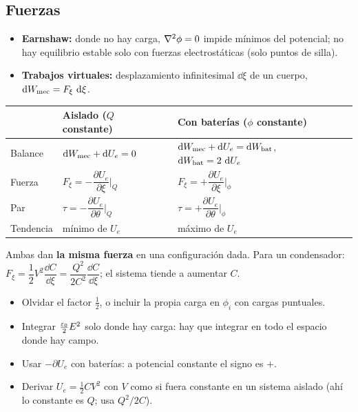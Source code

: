 \subsection{Fuerzas}

\begin{itemize}
  \item \textbf{Earnshaw:} donde no hay carga, $\nabla^2\phi=0$ impide mínimos del potencial; no hay equilibrio estable solo con fuerzas electrostáticas (solo puntos de silla).
  \item \textbf{Trabajos virtuales:} desplazamiento infinitesimal $\dd\xi$ de un cuerpo, $\mathop{}\!\mathrm{d}W_{\mathrm{mec}}=F_\xi\,\mathop{}\!\mathrm{d}\xi$.
\end{itemize}
\begin{center}
\small
\renewcommand{\arraystretch}{1.7}
\begin{tabular}{@{}lll@{}}
\toprule
& Aislado ($Q$ constante) & Con baterías ($\phi$ constante)\\
\midrule
Balance & $\mathop{}\!\mathrm{d}W_{\mathrm{mec}}+\mathop{}\!\mathrm{d} U_e=0$ & $\mathop{}\!\mathrm{d}W_{\mathrm{mec}}+\mathop{}\!\mathrm{d} U_e=\mathop{}\!\mathrm{d}W_{\mathrm{bat}}$, \ $\mathop{}\!\mathrm{d}W_{\mathrm{bat}}=2\,\mathop{}\!\mathrm{d} U_e$\\
Fuerza & $F_\xi=-\dfrac{\partial U_e}{\partial\xi}\Big|_Q$ & $F_\xi=+\dfrac{\partial U_e}{\partial\xi}\Big|_\phi$\\
Par & $\tau=-\dfrac{\partial U_e}{\partial\theta}\Big|_Q$ & $\tau=+\dfrac{\partial U_e}{\partial\theta}\Big|_\phi$\\
Tendencia & mínimo de $U_e$ & máximo de $U_e$\\
\bottomrule
\end{tabular}
\end{center}
Ambas dan \textbf{la misma fuerza} en una configuración dada. Para un condensador: $F_\xi=\dfrac12V^2\dfrac{\dd C}{\dd\xi}=\dfrac{Q^2}{2C^2}\dfrac{\dd C}{\dd\xi}$; el sistema tiende a
aumentar $C$.

\begin{trampa}
\begin{itemize}
  \item Olvidar el factor $\frac12$, o incluir la propia carga en $\phi_i$ con cargas puntuales.
  \item Integrar $\frac{\varepsilon_0}{2}E^2$ solo donde hay carga: hay que integrar en todo el espacio donde hay campo.
  \item Usar $-\partial U_e$ con baterías: a potencial constante el signo es $+$.
  \item Derivar $U_e=\frac12CV^2$ con $V$ como si fuera constante en un sistema aislado (ahí lo constante es $Q$; usa $Q^2/2C$).
\end{itemize}
\end{trampa}

